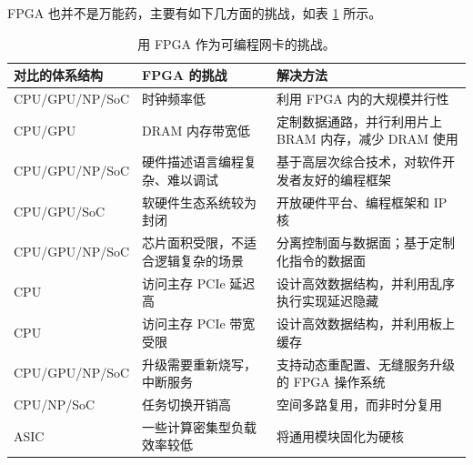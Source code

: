 




FPGA 也并不是万能药，主要有如下几方面的挑战，如表 \ref{background:tab:fpga-challenges} 所示。

\begin{table}[htbp]
	\centering
	\caption{用 FPGA 作为可编程网卡的挑战。}
	\small
	\begin{tabular}{l|p{}|p{}}
		\hline
		对比的体系结构 & FPGA 的挑战 & 解决方法 \\
		\hline
		\hline
		CPU/GPU/NP/SoC & 时钟频率低 & 利用 FPGA 内的大规模并行性 \\
		\hline 
		CPU/GPU & DRAM 内存带宽低 & 定制数据通路，并行利用片上 BRAM 内存，减少 DRAM 使用 \\
		\hline
		CPU/GPU/NP/SoC & 硬件描述语言编程复杂、难以调试 & 基于高层次综合技术，对软件开发者友好的编程框架 \\
		\hline
		CPU/GPU/SoC & 软硬件生态系统较为封闭 & 开放硬件平台、编程框架和 IP 核 \\
		\hline
		CPU/GPU/NP/SoC & 芯片面积受限，不适合逻辑复杂的场景 & 分离控制面与数据面；基于定制化指令的数据面 \\
		\hline
		CPU & 访问主存 PCIe 延迟高 & 设计高效数据结构，并利用乱序执行实现延迟隐藏 \\
		\hline
		CPU & 访问主存 PCIe 带宽受限 & 设计高效数据结构，并利用板上缓存 \\
		\hline
		CPU/GPU/NP/SoC & 升级需要重新烧写，中断服务 & 支持动态重配置、无缝服务升级的 FPGA 操作系统 \\
		\hline
		CPU/NP/SoC & 任务切换开销高 & 空间多路复用，而非时分复用 \\
		\hline
		ASIC & 一些计算密集型负载效率较低 & 将通用模块固化为硬核 \\
		\hline
	\end{tabular}
	\label{background:tab:fpga-challenges}
\end{table}


